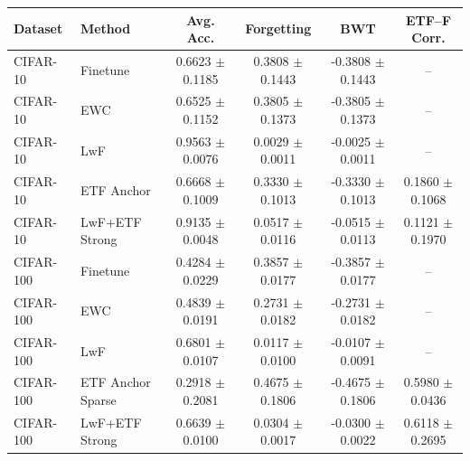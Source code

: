 \begin{tabular}{llcccc}
\hline
Dataset & Method & Avg. Acc. & Forgetting & BWT & ETF--F Corr. \\
\hline
CIFAR-10 & Finetune & 0.6623 $\pm$ 0.1185 & 0.3808 $\pm$ 0.1443 & -0.3808 $\pm$ 0.1443 & -- \\
CIFAR-10 & EWC & 0.6525 $\pm$ 0.1152 & 0.3805 $\pm$ 0.1373 & -0.3805 $\pm$ 0.1373 & -- \\
CIFAR-10 & LwF & 0.9563 $\pm$ 0.0076 & 0.0029 $\pm$ 0.0011 & -0.0025 $\pm$ 0.0011 & -- \\
CIFAR-10 & ETF Anchor & 0.6668 $\pm$ 0.1009 & 0.3330 $\pm$ 0.1013 & -0.3330 $\pm$ 0.1013 & 0.1860 $\pm$ 0.1068 \\
CIFAR-10 & LwF+ETF Strong & 0.9135 $\pm$ 0.0048 & 0.0517 $\pm$ 0.0116 & -0.0515 $\pm$ 0.0113 & 0.1121 $\pm$ 0.1970 \\
CIFAR-100 & Finetune & 0.4284 $\pm$ 0.0229 & 0.3857 $\pm$ 0.0177 & -0.3857 $\pm$ 0.0177 & -- \\
CIFAR-100 & EWC & 0.4839 $\pm$ 0.0191 & 0.2731 $\pm$ 0.0182 & -0.2731 $\pm$ 0.0182 & -- \\
CIFAR-100 & LwF & 0.6801 $\pm$ 0.0107 & 0.0117 $\pm$ 0.0100 & -0.0107 $\pm$ 0.0091 & -- \\
CIFAR-100 & ETF Anchor Sparse & 0.2918 $\pm$ 0.2081 & 0.4675 $\pm$ 0.1806 & -0.4675 $\pm$ 0.1806 & 0.5980 $\pm$ 0.0436 \\
CIFAR-100 & LwF+ETF Strong & 0.6639 $\pm$ 0.0100 & 0.0304 $\pm$ 0.0017 & -0.0300 $\pm$ 0.0022 & 0.6118 $\pm$ 0.2695 \\
\hline
\end{tabular}
